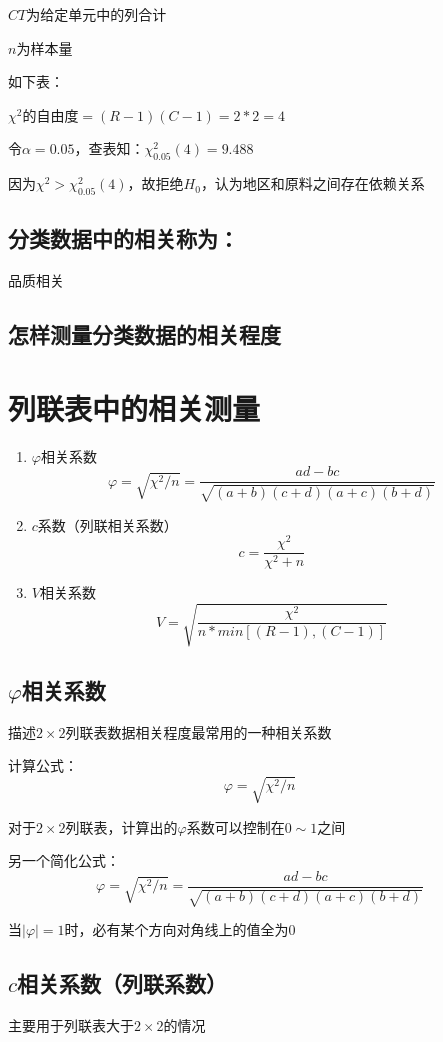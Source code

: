 \documentclass[UTF8,10pt]{book}
\begin{document}
$CT$为给定单元中的列合计 

$n$为样本量 

如下表： 

$\chi^2$的自由度$=(R-1)(C-1)=2*2=4$ 

令$\alpha=0.05$，查表知：$\chi^2_{0.05}(4)=9.488$ 

因为$\chi^2>\chi^2_{0.05}(4)$，故拒绝$H_0$，认为地区和原料之间存在依赖关系	

\subsection{分类数据中的相关称为：}	品质相关	

\subsection{怎样测量分类数据的相关程度}	

\section{列联表中的相关测量}

\begin{enumerate}
	\item $\varphi $相关系数 
	$$\varphi = \sqrt{\chi^2/n} = \frac{ad-bc}{\sqrt{(a+b)(c+d)(a+c)(b+d)}}$$ 
	\item $c$系数（列联相关系数） 
	$$c = \frac{\chi^2}{\chi^2 + n}$$ 
	\item $V$相关系数 
	$$V = \sqrt{\frac{\chi^2}{n*min[(R-1),(C-1)]}}$$

\end{enumerate} 

\subsection{$\varphi$相关系数}	
描述$2\times 2$列联表数据相关程度最常用的一种相关系数 

计算公式： $$\varphi = \sqrt{\chi^2/n}$$ 

对于$2\times 2$列联表，计算出的$\varphi$系数可以控制在$0\sim1$之间 

另一个简化公式： 
$$\varphi = \sqrt{\chi^2/n} = \frac{ad-bc}{\sqrt{(a+b)(c+d)(a+c)(b+d)}}$$ 

当$|\varphi|=1$时，必有某个方向对角线上的值全为0	


\subsection{$c$相关系数（列联系数）}	
主要用于列联表大于$2\times 2$的情况 
\end{document}

